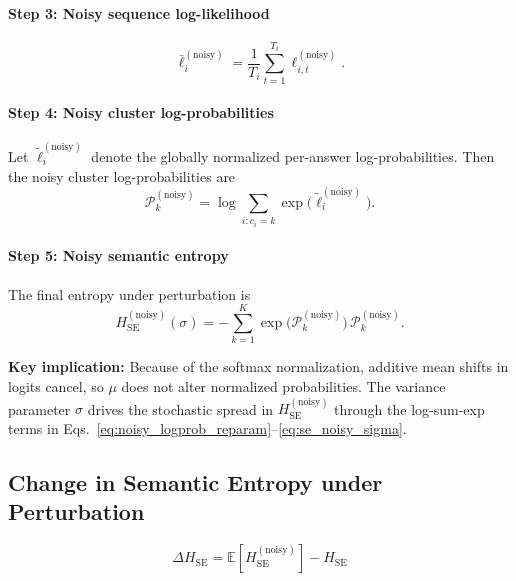\documentclass{article}
\begin{document}
\paragraph{Step 3: Noisy sequence log-likelihood}
\begin{equation}
\bar{\ell}_i^{(\text{noisy})} = \frac{1}{T_i} \sum_{t=1}^{T_i} \ell_{i,t}^{(\text{noisy})}.
\label{eq:noisy_seq_logprob_explicit}
\end{equation}

\paragraph{Step 4: Noisy cluster log-probabilities}
Let $\tilde{\ell}_i^{(\text{noisy})}$ denote the globally normalized per-answer log-probabilities. Then the noisy cluster log-probabilities are
\begin{equation}
\mathcal{P}_k^{(\text{noisy})} = \log \sum_{i : c_i = k} \exp\big(\tilde{\ell}_i^{(\text{noisy})}\big).
\label{eq:noisy_cluster_logprob}
\end{equation}

\paragraph{Step 5: Noisy semantic entropy}
The final entropy under perturbation is
\begin{equation}
H_{\text{SE}}^{(\text{noisy})}(\sigma) = -\sum_{k=1}^{K} \exp\big(\mathcal{P}_k^{(\text{noisy})}\big) \, \mathcal{P}_k^{(\text{noisy})}.
\label{eq:se_noisy_sigma}
\end{equation}

\textbf{Key implication:} Because of the softmax normalization, additive mean shifts in logits cancel, so $\mu$ does not alter normalized probabilities. The variance parameter $\sigma$ drives the stochastic spread in $H_{\text{SE}}^{(\text{noisy})}$ through the log-sum-exp terms in Eqs.~\eqref{eq:noisy_logprob_reparam}--\eqref{eq:se_noisy_sigma}.

\subsection{Change in Semantic Entropy under Perturbation}

\begin{equation}
\Delta H_{\text{SE}} = \mathbb{E}[H_{\text{SE}}^{(\text{noisy})}] - H_{\text{SE}}
\label{eq:delta_se}
\end{equation}
\end{document}

